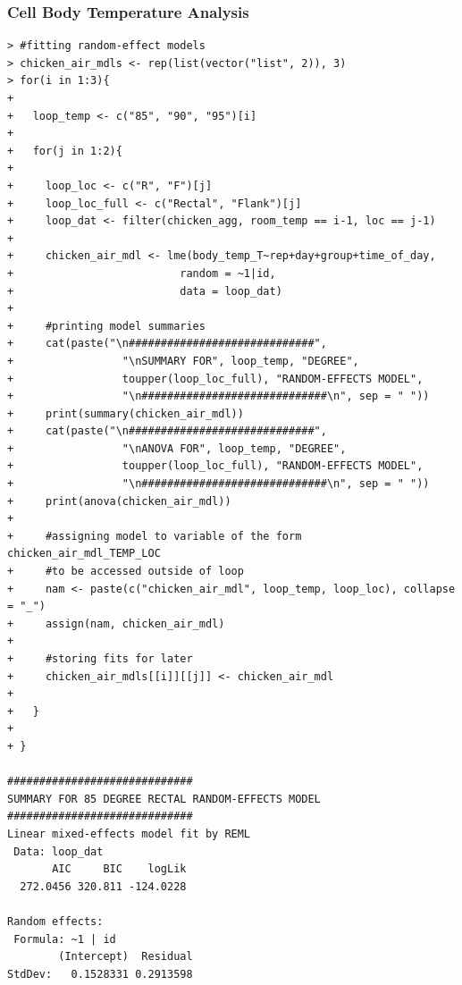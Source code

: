 \documentclass[a4paper, 10pt, titlepage]{article}
\begin{document}
\subsubsection{Cell Body Temperature Analysis}
\begin{lstlisting}[basicstyle = \footnotesize \ttfamily]
> #fitting random-effect models
> chicken_air_mdls <- rep(list(vector("list", 2)), 3)
> for(i in 1:3){
+   
+   loop_temp <- c("85", "90", "95")[i]
+   
+   for(j in 1:2){
+     
+     loop_loc <- c("R", "F")[j]
+     loop_loc_full <- c("Rectal", "Flank")[j]   
+     loop_dat <- filter(chicken_agg, room_temp == i-1, loc == j-1)
+     
+     chicken_air_mdl <- lme(body_temp_T~rep+day+group+time_of_day,
+                          random = ~1|id, 
+                          data = loop_dat)   
+     
+     #printing model summaries
+     cat(paste("\n#############################", 
+                 "\nSUMMARY FOR", loop_temp, "DEGREE", 
+                 toupper(loop_loc_full), "RANDOM-EFFECTS MODEL", 
+                 "\n#############################\n", sep = " "))
+     print(summary(chicken_air_mdl))
+     cat(paste("\n#############################", 
+                 "\nANOVA FOR", loop_temp, "DEGREE", 
+                 toupper(loop_loc_full), "RANDOM-EFFECTS MODEL", 
+                 "\n#############################\n", sep = " "))
+     print(anova(chicken_air_mdl))
+     
+     #assigning model to variable of the form chicken_air_mdl_TEMP_LOC
+     #to be accessed outside of loop
+     nam <- paste(c("chicken_air_mdl", loop_temp, loop_loc), collapse = "_")
+     assign(nam, chicken_air_mdl)
+     
+     #storing fits for later
+     chicken_air_mdls[[i]][[j]] <- chicken_air_mdl
+     
+   }
+   
+ }

############################# 
SUMMARY FOR 85 DEGREE RECTAL RANDOM-EFFECTS MODEL 
#############################
Linear mixed-effects model fit by REML
 Data: loop_dat 
       AIC     BIC    logLik
  272.0456 320.811 -124.0228

Random effects:
 Formula: ~1 | id
        (Intercept)  Residual
StdDev:   0.1528331 0.2913598


\end{lstlisting}
\end{document}
